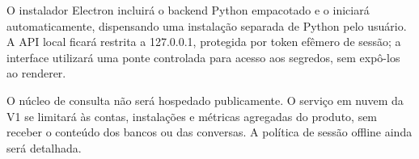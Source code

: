O instalador Electron incluirá o backend Python empacotado e o iniciará automaticamente, dispensando uma instalação separada de Python pelo usuário. A API local ficará restrita a 127.0.0.1, protegida por token efêmero de sessão; a interface utilizará uma ponte controlada para acesso aos segredos, sem expô-los ao renderer.

O núcleo de consulta não será hospedado publicamente. O serviço em nuvem da V1 se limitará às contas, instalações e métricas agregadas do produto, sem receber o conteúdo dos bancos ou das conversas. A política de sessão offline ainda será detalhada.
